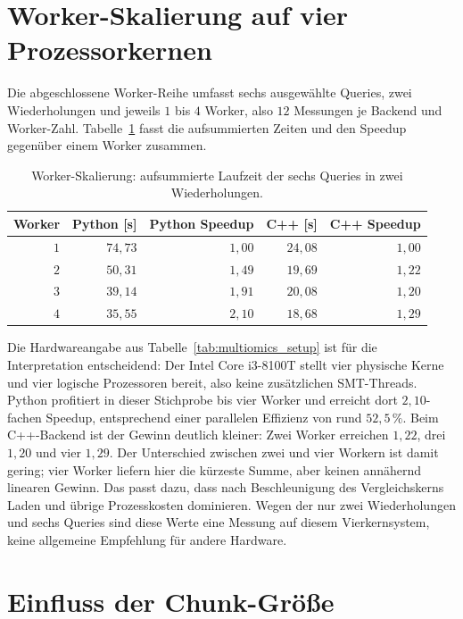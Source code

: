 \documentclass[a4paper,12pt, twoside]{report}
\theoremstyle{definition}
\begin{document}
\section{Worker-Skalierung auf vier Prozessorkernen}
\label{sec:multiomics_workers}

Die abgeschlossene Worker-Reihe umfasst sechs ausgewählte Queries, zwei Wiederholungen und jeweils $1$ bis $4$ Worker, also $12$ Messungen je Backend und Worker-Zahl. Tabelle~\ref{tab:multiomics_workers} fasst die aufsummierten Zeiten und den Speedup gegenüber einem Worker zusammen.

\begin{table}[!htbp]
\centering
\small
\caption{Worker-Skalierung: aufsummierte Laufzeit der sechs Queries in zwei Wiederholungen.}
\label{tab:multiomics_workers}
\begin{tabular}{@{}rrrrr@{}}
\toprule
Worker & Python [s] & Python Speedup & C++ [s] & C++ Speedup \\
\midrule
$1$ & $74{,}73$ & $1{,}00$ & $24{,}08$ & $1{,}00$ \\
$2$ & $50{,}31$ & $1{,}49$ & $19{,}69$ & $1{,}22$ \\
$3$ & $39{,}14$ & $1{,}91$ & $20{,}08$ & $1{,}20$ \\
$4$ & $35{,}55$ & $2{,}10$ & $18{,}68$ & $1{,}29$ \\
\bottomrule
\end{tabular}
\end{table}

Die Hardwareangabe aus Tabelle~\ref{tab:multiomics_setup} ist für die Interpretation entscheidend: Der Intel Core i3-8100T stellt vier physische Kerne und vier logische Prozessoren bereit, also keine zusätzlichen SMT-Threads. Python profitiert in dieser Stichprobe bis vier Worker und erreicht dort $2{,}10$-fachen Speedup, entsprechend einer parallelen Effizienz von rund $52{,}5\,\%$. Beim C++-Backend ist der Gewinn deutlich kleiner: Zwei Worker erreichen $1{,}22$, drei $1{,}20$ und vier $1{,}29$. Der Unterschied zwischen zwei und vier Workern ist damit gering; vier Worker liefern hier die kürzeste Summe, aber keinen annähernd linearen Gewinn. Das passt dazu, dass nach Beschleunigung des Vergleichskerns Laden und übrige Prozesskosten dominieren. Wegen der nur zwei Wiederholungen und sechs Queries sind diese Werte eine Messung auf diesem Vierkernsystem, keine allgemeine Empfehlung für andere Hardware.

\section{Einfluss der Chunk-Größe}
\label{sec:multiomics_chunksize}
\end{document}
